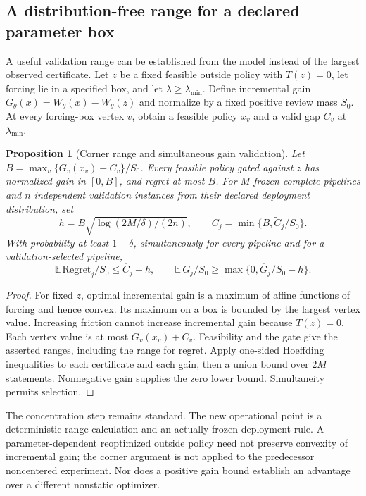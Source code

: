 \documentclass[11pt,letterpaper]{article}
\newtheorem{proposition}[theorem]{Proposition}
\theoremstyle{definition}
\newcommand{\1}{\mathbf 1}
\begin{document}
\subsection{A distribution-free range for a declared parameter box}\label{sec:r13-range}
A useful validation range can be established from the model instead of the largest observed certificate. Let $z$ be a fixed feasible outside policy with $T(z)=0$, let forcing lie in a specified box, and let $\lambda\geq\lambda_{\min}$. Define incremental gain $G_\theta(x)=W_\theta(x)-W_\theta(z)$ and normalize by a fixed positive review mass $S_0$. At every forcing-box vertex $v$, obtain a feasible policy $x_v$ and a valid gap $C_v$ at $\lambda_{\min}$.
\begin{proposition}[Corner range and simultaneous gain validation]\label{prop:r13-range}
Let $B=\max_v\{G_v(x_v)+C_v\}/S_0$. Every feasible policy gated against $z$ has normalized gain in $[0,B]$, and regret at most $B$. For $M$ frozen complete pipelines and $n$ independent validation instances from their declared deployment distribution, set
\[
 h=B\sqrt{\log(2M/\delta)/(2n)},\qquad
 C_j=\min\{B,\widetilde C_j/S_0\}.
\]
With probability at least $1-\delta$, simultaneously for every pipeline and for a validation-selected pipeline,
\begin{equation}\label{eq:r13-validation}
 \mathbb E\,\mathrm{Regret}_j/S_0\leq\overline C_j+h,
 \qquad
 \mathbb E\,G_j/S_0\geq\max\{0,\overline G_j/S_0-h\}.
\end{equation}
\end{proposition}
\begin{proof}
For fixed $z$, optimal incremental gain is a maximum of affine functions of forcing and hence convex. Its maximum on a box is bounded by the largest vertex value. Increasing friction cannot increase incremental gain because $T(z)=0$. Each vertex value is at most $G_v(x_v)+C_v$. Feasibility and the gate give the asserted ranges, including the range for regret. Apply one-sided Hoeffding inequalities to each certificate and each gain, then a union bound over $2M$ statements. Nonnegative gain supplies the zero lower bound. Simultaneity permits selection.
\end{proof}
The concentration step remains standard. The new operational point is a deterministic range calculation and an actually frozen deployment rule. A parameter-dependent reoptimized outside policy need not preserve convexity of incremental gain; the corner argument is not applied to the predecessor noncentered experiment. Nor does a positive gain bound establish an advantage over a different nonstatic optimizer.
\end{document}
